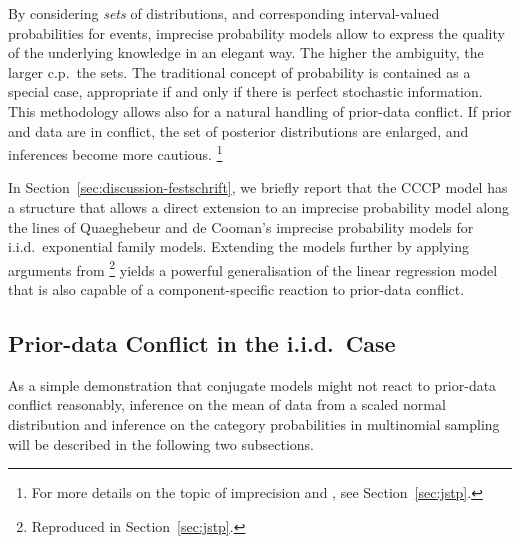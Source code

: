 By considering \emph{sets} of distributions, and corresponding
interval-valued probabilities for events, imprecise probability models allow
to express the quality of the underlying knowledge in an elegant way.
The higher the ambiguity, the larger c.p.\ the sets.
The traditional concept of probability is contained as a special case,
appropriate if and only if there is perfect stochastic information.
This methodology allows also for a natural handling of prior-data conflict.
If prior and data are in conflict, the set of posterior distributions are enlarged,
and inferences become more cautious.%
\footnote{For more details on the topic of imprecision and \pdc, see Section~\ref{sec:jstp}.}

In Section~\ref{sec:discussion-festschrift}, we briefly report that the CCCP model has a structure
that allows a direct extension to an imprecise probability model
along the lines of Quaeghebeur and de Cooman's \parencite*{2005:quaeghebeurcooman} imprecise probability models
for i.i.d.\ exponential family models. Extending the models further
by applying arguments from \textcite{Walter2009a}%
\footnote{Reproduced in Section~\ref{sec:jstp}.}
yields a powerful generalisation
of the linear regression model that is also capable of a component-specific reaction to prior-data conflict.

\subsection{Prior-data Conflict in the i.i.d.\ Case}
\label{sec:iid}

As a simple demonstration that conjugate models might not react to
prior-data conflict reasonably, inference on the mean of data from a
scaled normal distribution and inference on the category
probabilities in multinomial sampling will be described in the
following two subsections.

